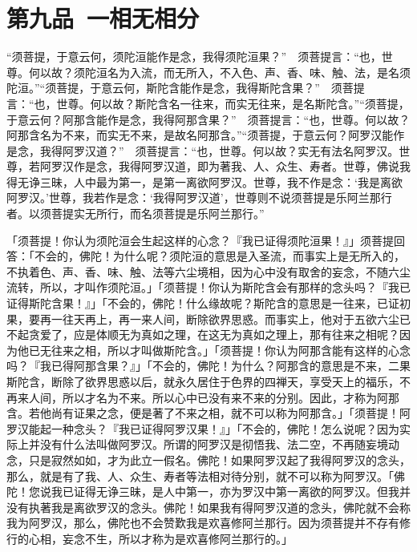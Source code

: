 \documentclass[12pt,twoside,openany]{book}
\newcommand{\kai}[1]{{\CJKfamily{kai}#1}}
\begin{document}
\chapter{第九品\ 一相无相分}
\begin{pinyinscope}
“须菩提，于意云何，须陀洹能作是念，我得须陀洹果？”　须菩提言：“也，世尊。何以故？须陀洹名为入流，而无所入，不入色、声、香、味、触、法，是名须陀洹。”“须菩提，于意云何，斯陀含能作是念，我得斯陀含果？”　须菩提言：“也，世尊。何以故？斯陀含名一往来，而实无往来，是名斯陀含。”“须菩提，于意云何？阿那含能作是念，我得阿那含果？”　须菩提言：“也，世尊。何以故？阿那含名为不来，而实无不来，是故名阿那含。”“须菩提，于意云何？阿罗汉能作是念，我得阿罗汉道？”　须菩提言：“也，世尊。何以故？实无有法名阿罗汉。世尊，若阿罗汉作是念，我得阿罗汉道，即为著我、人、众生、寿者。世尊，佛说我得无诤三昧，人中最为第一，是第一离欲阿罗汉。世尊，我不作是念：‘我是离欲阿罗汉。’世尊，我若作是念：‘我得阿罗汉道’，世尊则不说须菩提是乐阿兰那行者。以须菩提实无所行，而名须菩提是乐阿兰那行。”
\end{pinyinscope}

\kai{「须菩提！你认为须陀洹会生起这样的心念？『我已证得须陀洹果！』」须菩提回答：「不会的，佛陀！为什么呢？须陀洹的意思是入圣流，而事实上是无所入的，不执着色、声、香、味、触、法等六尘境相，因为心中没有取舍的妄念，不随六尘流转，所以，才叫作须陀洹。」「须菩提！你认为斯陀含会有那样的念头吗？『我已证得斯陀含果！』」「不会的，佛陀！什么缘故呢？斯陀含的意思是一往来，已证初果，要再一往天再上，再一来人间，断除欲界思惑。而事实上，他对于五欲六尘已不起贪爱了，应是体顺无为真如之理，在这无为真如之理上，那有往来之相呢？因为他已无往来之相，所以才叫做斯陀含。」「须菩提！你认为阿那含能有这样的心念吗？『我已得阿那含果？』」「不会的，佛陀！为什么？阿那含的意思是不来，二果斯陀含，断除了欲界思惑以后，就永久居住于色界的四禅天，享受天上的福乐，不再来人间，所以才名为不来。所以心中已没有来不来的分别。因此，才称为阿那含。若他尚有证果之念，便是著了不来之相，就不可以称为阿那含。」「须菩提！阿罗汉能起一种念头？『我已证得阿罗汉果！』」「不会的，佛陀！怎么说呢？因为实际上并没有什么法叫做阿罗汉。所谓的阿罗汉是彻悟我、法二空，不再随妄境动念，只是寂然如如，才为此立一假名。佛陀！如果阿罗汉起了我得阿罗汉的念头，那么，就是有了我、人、众生、寿者等法相对待分别，就不可以称为阿罗汉。「佛陀！您说我已证得无诤三昧，是人中第一，亦为罗汉中第一离欲的阿罗汉。但我并没有执著我是离欲罗汉的念头。佛陀！如果我有得阿罗汉道的念头，佛陀就不会称我为阿罗汉，那么，佛陀也不会赞歎我是欢喜修阿兰那行。因为须菩提并不存有修行的心相，妄念不生，所以才称为是欢喜修阿兰那行的。」}
\end{document}
